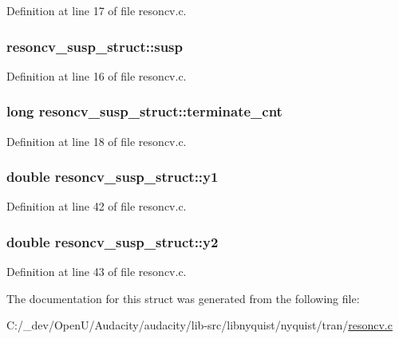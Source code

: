 Definition at line 17 of file resoncv.\+c.

\subsubsection[{\texorpdfstring{susp}{susp}}]{ resoncv\+\_\+susp\+\_\+struct\+::susp}\hypertarget{structresoncv__susp__struct_a408f0059521816c74f91b37621c892ae}{}\label{structresoncv__susp__struct_a408f0059521816c74f91b37621c892ae}


Definition at line 16 of file resoncv.\+c.

\subsubsection[{\texorpdfstring{terminate\+\_\+cnt}{terminate_cnt}}]{\setlength{\rightskip}{0pt plus 5cm}long resoncv\+\_\+susp\+\_\+struct\+::terminate\+\_\+cnt}\hypertarget{structresoncv__susp__struct_aec9c30b4629ecdd7a51272ab88bca9c5}{}\label{structresoncv__susp__struct_aec9c30b4629ecdd7a51272ab88bca9c5}


Definition at line 18 of file resoncv.\+c.

\subsubsection[{\texorpdfstring{y1}{y1}}]{\setlength{\rightskip}{0pt plus 5cm}double resoncv\+\_\+susp\+\_\+struct\+::y1}\hypertarget{structresoncv__susp__struct_abbfe410987be28fd8d043aff9adb1026}{}\label{structresoncv__susp__struct_abbfe410987be28fd8d043aff9adb1026}


Definition at line 42 of file resoncv.\+c.

\subsubsection[{\texorpdfstring{y2}{y2}}]{\setlength{\rightskip}{0pt plus 5cm}double resoncv\+\_\+susp\+\_\+struct\+::y2}\hypertarget{structresoncv__susp__struct_a86f89bc00ee0386b9011e707ef997348}{}\label{structresoncv__susp__struct_a86f89bc00ee0386b9011e707ef997348}


Definition at line 43 of file resoncv.\+c.



The documentation for this struct was generated from the following file\+:\begin{DoxyCompactItemize}
\item 
C\+:/\+\_\+dev/\+Open\+U/\+Audacity/audacity/lib-\/src/libnyquist/nyquist/tran/\hyperlink{resoncv_8c}{resoncv.\+c}\end{DoxyCompactItemize}
